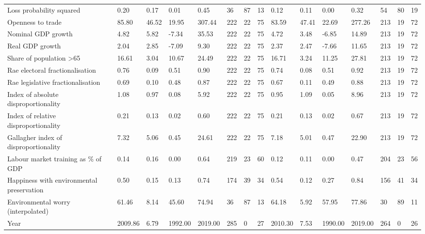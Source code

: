 \begin{longtable}{lllllllllllllll}
Loss probability squared & 0.20 & 0.17 & 0.01 & 0.45 & 36 & 87 & 13 & 0.12 & 0.11 & 0.00 & 0.32 & 54 & 80 & 19\\
Openness to trade & 85.80 & 46.52 & 19.95 & 307.44 & 222 & 22 & 75 & 83.59 & 47.41 & 22.69 & 277.26 & 213 & 19 & 72\\
Nominal GDP growth & 4.82 & 5.82 & -7.34 & 35.53 & 222 & 22 & 75 & 4.72 & 3.48 & -6.85 & 14.89 & 213 & 19 & 72\\
Real GDP growth & 2.04 & 2.85 & -7.09 & 9.30 & 222 & 22 & 75 & 2.37 & 2.47 & -7.66 & 11.65 & 213 & 19 & 72\\
\addlinespace
Share of population >65 & 16.61 & 3.04 & 10.67 & 24.49 & 222 & 22 & 75 & 16.71 & 3.24 & 11.25 & 27.81 & 213 & 19 & 72\\
Rae electoral fractionalisation & 0.76 & 0.09 & 0.51 & 0.90 & 222 & 22 & 75 & 0.74 & 0.08 & 0.51 & 0.92 & 213 & 19 & 72\\
Rae legislative fractionalisation & 0.69 & 0.10 & 0.48 & 0.87 & 222 & 22 & 75 & 0.67 & 0.11 & 0.49 & 0.88 & 213 & 19 & 72\\
Index of absolute disproportionality & 1.08 & 0.97 & 0.08 & 5.92 & 222 & 22 & 75 & 0.95 & 1.09 & 0.05 & 8.96 & 213 & 19 & 72\\
Index of relative disproportionality & 0.21 & 0.13 & 0.02 & 0.60 & 222 & 22 & 75 & 0.21 & 0.13 & 0.02 & 0.67 & 213 & 19 & 72\\
\addlinespace
Gallagher index of disproportionality & 7.32 & 5.06 & 0.45 & 24.61 & 222 & 22 & 75 & 7.18 & 5.01 & 0.47 & 22.90 & 213 & 19 & 72\\
Labour market training as \% of GDP & 0.14 & 0.16 & 0.00 & 0.64 & 219 & 23 & 60 & 0.12 & 0.11 & 0.00 & 0.47 & 204 & 23 & 56\\
Happiness with environmental preservation & 0.50 & 0.15 & 0.13 & 0.74 & 174 & 39 & 34 & 0.54 & 0.12 & 0.27 & 0.84 & 156 & 41 & 34\\
Environmental worry (interpolated) & 61.46 & 8.14 & 45.60 & 74.94 & 36 & 87 & 13 & 64.18 & 5.92 & 57.95 & 77.86 & 30 & 89 & 11\\
Year & 2009.86 & 6.79 & 1992.00 & 2019.00 & 285 & 0 & 27 & 2010.30 & 7.53 & 1990.00 & 2019.00 & 264 & 0 & 26\\
\bottomrule
\end{longtable}
